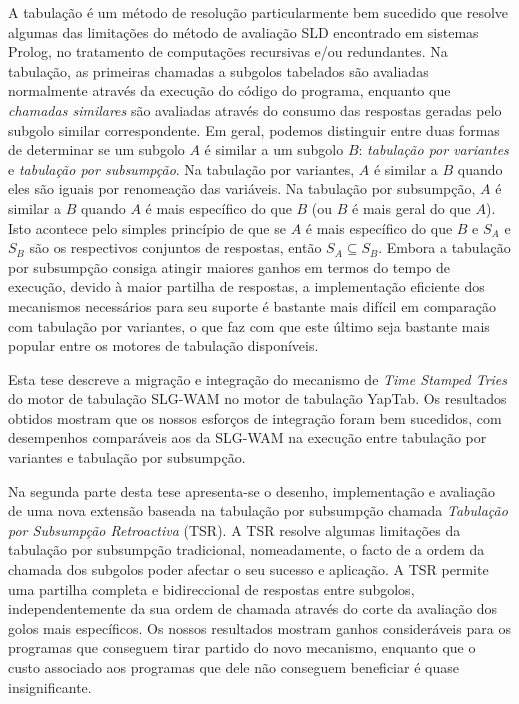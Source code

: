 A tabulação é um método de resolução particularmente bem sucedido que resolve algumas das limitações
do método de avaliação SLD encontrado em sistemas Prolog, no tratamento de computações recursivas e/ou redundantes.
Na tabulação, as primeiras chamadas a subgolos tabelados são avaliadas normalmente através da execução do código do
programa, enquanto que \emph{chamadas similares} são avaliadas através do consumo das respostas geradas
pelo subgolo similar correspondente.
Em geral, podemos distinguir entre duas formas de determinar se um subgolo $A$ é similar a um subgolo $B$:
\emph{tabulação por variantes} e \emph{tabulação por subsumpção}.
Na tabulação por variantes, $A$ é similar a $B$ quando eles são iguais por renomeação das variáveis.
Na tabulação por subsumpção, $A$ é similar a $B$ quando $A$ é mais específico do que $B$ (ou $B$ é mais geral do que $A$).
Isto acontece pelo simples princípio de que se $A$ é mais específico do que $B$ e $S_A$ e $S_B$ são os respectivos
conjuntos de respostas, então $S_A \subseteq S_B$.
Embora a tabulação por subsumpção consiga atingir maiores ganhos em termos do tempo de execução, devido
à maior partilha de respostas, a implementação eficiente dos mecanismos necessários para seu suporte é bastante
mais difícil em comparação com tabulação por variantes, o que faz com que este último seja bastante mais popular
entre os motores de tabulação disponíveis.

Esta tese descreve a migração e integração do mecanismo de \emph{Time Stamped Tries} do motor de tabulação
SLG-WAM no motor de tabulação YapTab. Os resultados obtidos mostram que os nossos esforços de integração foram
bem sucedidos, com desempenhos comparáveis aos da SLG-WAM na execução entre tabulação por variantes e tabulação
por subsumpção.

Na segunda parte desta tese apresenta-se o desenho, implementação e avaliação de uma nova extensão baseada na tabulação
por subsumpção chamada \emph{Tabulação por Subsumpção Retroactiva} (TSR). A TSR resolve algumas limitações da
tabulação por subsumpção tradicional, nomeadamente, o facto de a ordem da chamada dos subgolos poder afectar o seu sucesso e
aplicação. A TSR permite uma partilha completa e bidireccional de respostas entre subgolos, independentemente da
sua ordem de chamada através do corte da avaliação dos golos mais específicos.
Os nossos resultados mostram ganhos consideráveis para os programas que conseguem tirar partido do novo mecanismo,
enquanto que o custo associado aos programas que dele não conseguem beneficiar é quase insignificante.
